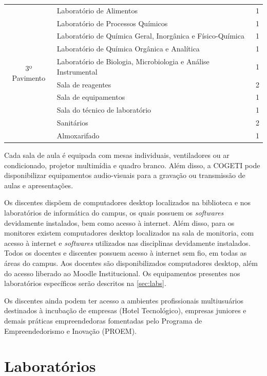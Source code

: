 \begin{quadro}
\begin{tabularx}{\textwidth}{c >{\centering\arraybackslash}X  c}
        \multirow{10}{*}{ 3º Pavimento } & Laboratório de Alimentos & 1 \\
        & Laboratório de Processos Químicos & 1 \\
        & Laboratório de Química Geral, Inorgânica e Físico-Química & 1 \\
        & Laboratório de Química Orgânica e Analítica & 1 \\
        & Laboratório de Biologia, Microbiologia e Análise Instrumental & 1 \\
        & Sala de reagentes & 2 \\
        & Sala de equipamentos & 1 \\
        & Sala do técnico de laboratório & 1 \\
        & Sanitários & 2 \\
        & Almoxarifado & 1 \\ \bottomrule

        \end{tabularx}
    \label{qua:blocoa}
\end{quadro}

Cada sala de aula é equipada com mesas individuais, ventiladores ou ar condicionado, projetor multimídia e quadro branco. Além disso, a COGETI pode disponibilizar equipamentos audio-visuais para a gravação ou transmissão de aulas e apresentações.

Os discentes dispõem de computadores desktop localizados na biblioteca e nos laboratórios de informática do campus, os quais possuem os \textit{softwares} devidamente instalados, bem como acesso à internet. Além disso, para os monitores existem computadores desktop localizados na sala de monitoria, com acesso à internet e \textit{softwares} utilizados nas disciplinas devidamente instalados. Todos os docentes e discentes possuem acesso à internet sem fio, em todas as áreas do campus. Aos docentes são disponibilizados computadores desktop, além do acesso liberado ao Moodle Institucional. Os equipamentos presentes nos laboratórios específicos serão descritos na \autoref{sec:labs}.

Os discentes ainda podem ter acesso a ambientes profissionais multiusuários destinados à incubação de empresas (Hotel Tecnológico), empresas juniores e demais práticas empreendedoras fomentadas pelo Programa de Empreendedorismo e Inovação (PROEM).

\section{Laboratórios}
\label{sec:labs}

